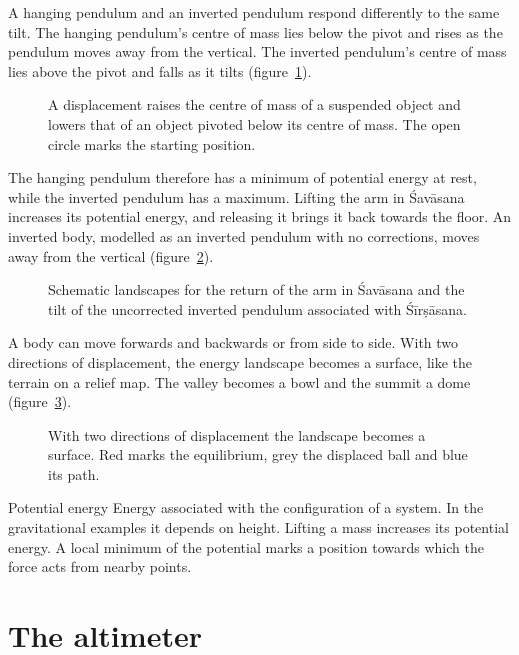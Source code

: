 A hanging pendulum and an inverted pendulum respond differently to the same tilt. The hanging pendulum's centre of mass lies below the pivot and rises as the pendulum moves away from the vertical. The inverted pendulum's centre of mass lies above the pivot and falls as it tilts (figure~\ref{fig:sugiu}).

\begin{figure}
\caption{A displacement raises the centre of mass of a suspended object and lowers that of an object pivoted below its centre of mass. The open circle marks the starting position.}
\label{fig:sugiu}
\end{figure}

The hanging pendulum therefore has a minimum of potential energy at rest, while the inverted pendulum has a maximum. Lifting the arm in Śavāsana increases its potential energy, and releasing it brings it back towards the floor. An inverted body, modelled as an inverted pendulum with no corrections, moves away from the vertical (figure~\ref{fig:paesaggiocorpo}).

\begin{figure}
\caption{Schematic landscapes for the return of the arm in Śavāsana and the tilt of the uncorrected inverted pendulum associated with Śīrṣāsana.}
\label{fig:paesaggiocorpo}
\end{figure}

A body can move forwards and backwards or from side to side. With two directions of displacement, the energy landscape becomes a surface, like the terrain on a relief map. The valley becomes a bowl and the summit a dome (figure~\ref{fig:concacupola}).

\begin{figure}
\caption{With two directions of displacement the landscape becomes a surface. Red marks the equilibrium, grey the displaced ball and blue its path.}
\label{fig:concacupola}
\end{figure}

\begin{parola}{Potential energy}
Energy associated with the configuration of a system. In the gravitational examples it depends on height. Lifting a mass increases its potential energy. A local minimum of the potential marks a position towards which the force acts from nearby points.
\end{parola}

\section{The altimeter}\label{sec:altimetro}

